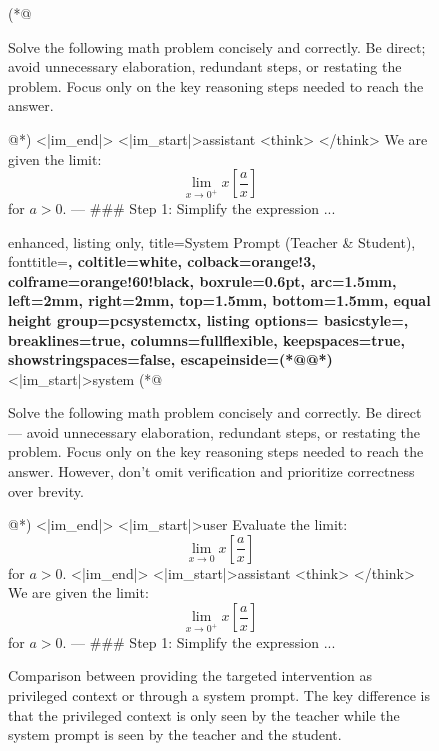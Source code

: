 \begin{figure}
\begin{minipage}[t]{0.48\textwidth}
\begin{tcblisting}
(*@\begin{minipage}[t]{0.95\linewidth}
\ttfamily\tiny\bfseries\color{blue!70!black}\raggedright
Solve the following math problem concisely and correctly. Be direct; avoid unnecessary elaboration, redundant steps, or restating the problem. Focus only on the key reasoning steps needed to reach the answer.
\end{minipage}@*)
<|im_end|>
<|im_start|>assistant
<think>
</think>
We are given the limit:
$$ \lim_{x \to 0^+} x \left[ \frac{a}{x} \right] $$
for $ a > 0 $.
---
### Step 1: Simplify the expression ...
\end{tcblisting}
\end{minipage}%
\hfill
\begin{minipage}[t]{0.48\textwidth}
\begin{tcblisting}{
    enhanced,
    listing only,
    title={System Prompt (Teacher \& Student)},
    fonttitle=\bfseries,
    coltitle=white,
    colback=orange!3,
    colframe=orange!60!black,
    boxrule=0.6pt,
    arc=1.5mm,
    left=2mm,
    right=2mm,
    top=1.5mm,
    bottom=1.5mm,
    equal height group=pcsystemctx,
    listing options={
        basicstyle=\ttfamily\tiny,
        breaklines=true,
        columns=fullflexible,
        keepspaces=true,
        showstringspaces=false,
        escapeinside={(*@}{@*)}
    }
}
<|im_start|>system
(*@\begin{minipage}[t]{0.95\linewidth}
\ttfamily\tiny\bfseries\color{blue!70!black}\raggedright
Solve the following math problem concisely and correctly. Be direct — avoid unnecessary elaboration, redundant steps, or restating the problem. Focus only on the key reasoning steps needed to reach the answer. However, don't omit verification and prioritize correctness over brevity.
\end{minipage}@*)
<|im_end|>
<|im_start|>user
Evaluate the limit: $$\lim_{x\to 0}x \left[ \frac{a}{x}\right]$$ for $a>0$.
<|im_end|>
<|im_start|>assistant
<think>
</think>
We are given the limit:
$$ \lim_{x \to 0^+} x \left[ \frac{a}{x} \right] $$
for $ a > 0 $.
---
### Step 1: Simplify the expression ...
\end{tcblisting}
\end{minipage}
    \caption{Comparison between providing the targeted intervention as privileged context or through a system prompt. The key difference is that the privileged context is only seen by the teacher while the system prompt is seen by the teacher and the student.}
    \label{fig: pc_vs_system_prompt_example}
\end{figure}

